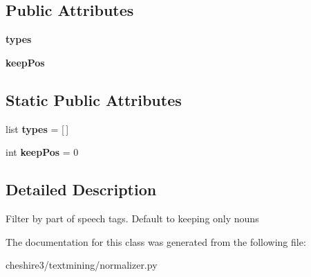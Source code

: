 \subsection*{Public Attributes}
\begin{DoxyCompactItemize}
\item 
\hypertarget{classcheshire3_1_1textmining_1_1normalizer_1_1_pos_type_normalizer_a1a9231dc88e829a8149ce8885e9cdc80}{{\bfseries types}}\label{classcheshire3_1_1textmining_1_1normalizer_1_1_pos_type_normalizer_a1a9231dc88e829a8149ce8885e9cdc80}

\item 
\hypertarget{classcheshire3_1_1textmining_1_1normalizer_1_1_pos_type_normalizer_a756aadfc03e7e295d5703e066a7bd5ed}{{\bfseries keep\-Pos}}\label{classcheshire3_1_1textmining_1_1normalizer_1_1_pos_type_normalizer_a756aadfc03e7e295d5703e066a7bd5ed}

\end{DoxyCompactItemize}
\subsection*{Static Public Attributes}
\begin{DoxyCompactItemize}
\item 
\hypertarget{classcheshire3_1_1textmining_1_1normalizer_1_1_pos_type_normalizer_a2418ee013739c7a81a138d2c379089c8}{list {\bfseries types} = \mbox{[}$\,$\mbox{]}}\label{classcheshire3_1_1textmining_1_1normalizer_1_1_pos_type_normalizer_a2418ee013739c7a81a138d2c379089c8}

\item 
\hypertarget{classcheshire3_1_1textmining_1_1normalizer_1_1_pos_type_normalizer_ad6e9d591a021279fea06d70aa854f73f}{int {\bfseries keep\-Pos} = 0}\label{classcheshire3_1_1textmining_1_1normalizer_1_1_pos_type_normalizer_ad6e9d591a021279fea06d70aa854f73f}

\end{DoxyCompactItemize}


\subsection{Detailed Description}
\begin{DoxyVerb}Filter by part of speech tags.  Default to keeping only nouns \end{DoxyVerb}
 

The documentation for this class was generated from the following file\-:\begin{DoxyCompactItemize}
\item 
cheshire3/textmining/normalizer.\-py\end{DoxyCompactItemize}
